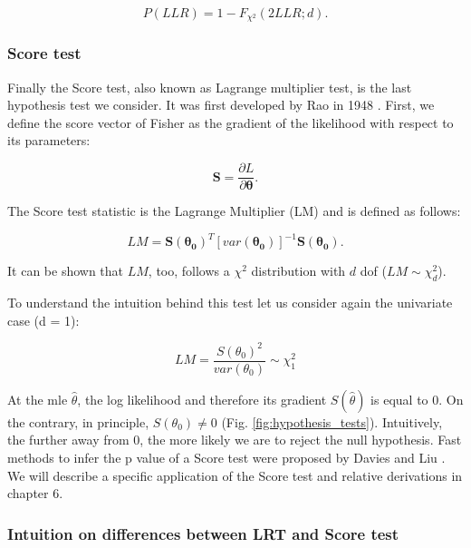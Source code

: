 \begin{equation}\label{eq:lrt_p_value}
    P(LLR) = 1-F_{\chi^2}(2LLR; d).
\end{equation}

\subsubsection{Score test}

Finally the Score test, also known as Lagrange multiplier test, is the last hypothesis test we consider. 
It was first developed by Rao in 1948 \cite{rao1948large}.
First, we define the score vector of Fisher as the gradient of the likelihood with respect to its parameters:

\begin{equation}\label{eq:score_vector}
    \mathbf{S} = \frac{\partial L}{\partial \boldsymbol{\theta}}.
\end{equation}

The Score test statistic is the Lagrange Multiplier (LM) and is defined as follows:

\begin{equation}\label{eq:lagrange_multiplier}
    LM = \mathbf{S}(\boldsymbol{\theta_0})^T [var(\boldsymbol{\theta_0})]^{-1}\mathbf{S}(\boldsymbol{\theta_0}). 
\end{equation}

It can be shown that $LM$, too, follows a $\chi^2$ distribution with $d$ dof ($LM \sim \chi^2_d$).

To understand the intuition behind this test let us consider again the univariate case (d = 1):

\begin{equation}\label{eq:lagrange_multiplier_univariate}
    LM = \frac{S(\theta_0)^2}{var(\theta_0)} \sim \chi^2_1
\end{equation}

At the \gls{mle} $\hat{\theta}$, the log likelihood and therefore its gradient $S(\hat{\theta})$ is equal to 0.
On the contrary, in principle, $ S(\theta_0) \neq 0 $ (Fig. \ref{fig:hypothesis_tests}). 
Intuitively, the further away from 0, the more likely we are to reject the null hypothesis.
Fast methods to infer the p value of a Score test were proposed by Davies  \cite{davies1980algorithm} and Liu \cite{liu2009new}.
We will describe a specific application of the Score test and relative derivations in chapter 6.

\subsubsection{Intuition on differences between LRT and Score test}

